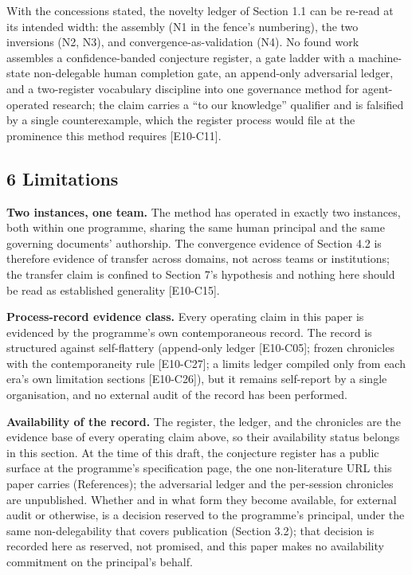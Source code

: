 \documentclass[
  11pt,
]{article}
\begin{document}
With the concessions stated, the novelty ledger of Section 1.1 can be
re-read at its intended width: the assembly (N1 in the fence's
numbering), the two inversions (N2, N3), and convergence-as-validation
(N4). No found work assembles a confidence-banded conjecture register, a
gate ladder with a machine-state non-delegable human completion gate, an
append-only adversarial ledger, and a two-register vocabulary discipline
into one governance method for agent-operated research; the claim
carries a ``to our knowledge'' qualifier and is falsified by a single
counterexample, which the register process would file at the prominence
this method requires {[}E10-C11{]}.

\subsection{6 Limitations}\label{limitations}

\textbf{Two instances, one team.} The method has operated in exactly two
instances, both within one programme, sharing the same human principal
and the same governing documents' authorship. The convergence evidence
of Section 4.2 is therefore evidence of transfer across domains, not
across teams or institutions; the transfer claim is confined to Section
7's hypothesis and nothing here should be read as established generality
{[}E10-C15{]}.

\textbf{Process-record evidence class.} Every operating claim in this
paper is evidenced by the programme's own contemporaneous record. The
record is structured against self-flattery (append-only ledger
{[}E10-C05{]}; frozen chronicles with the contemporaneity rule
{[}E10-C27{]}; a limits ledger compiled only from each era's own
limitation sections {[}E10-C26{]}), but it remains self-report by a
single organisation, and no external audit of the record has been
performed.

\textbf{Availability of the record.} The register, the ledger, and the
chronicles are the evidence base of every operating claim above, so
their availability status belongs in this section. At the time of this
draft, the conjecture register has a public surface at the programme's
specification page, the one non-literature URL this paper carries
(References); the adversarial ledger and the per-session chronicles are
unpublished. Whether and in what form they become available, for
external audit or otherwise, is a decision reserved to the programme's
principal, under the same non-delegability that covers publication
(Section 3.2); that decision is recorded here as reserved, not promised,
and this paper makes no availability commitment on the principal's
behalf.
\end{document}
